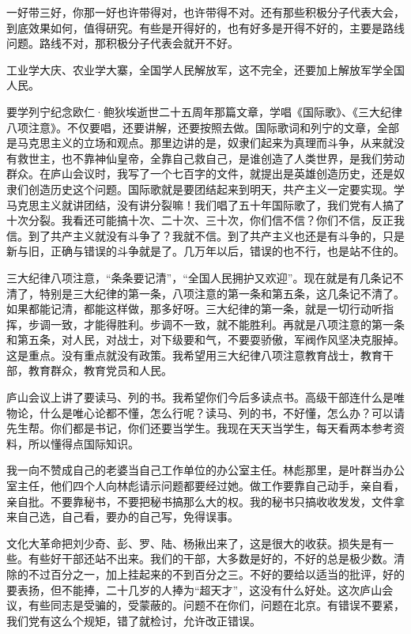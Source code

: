 一好带三好，你那一好也许带得对，也许带得不对。还有那些积极分子代表大会，到底效果如何，值得研究。有些是开得好的，也有好多是开得不好的，主要是路线问题。路线不对，那积极分子代表会就开不好。

工业学大庆、农业学大寨，全国学人民解放军，这不完全，还要加上解放军学全国人民。

要学列宁纪念欧仁·鲍狄埃逝世二十五周年那篇文章，学唱《国际歌》、《三大纪律八项注意》。不仅要唱，还要讲解，还要按照去做。国际歌词和列宁的文章，全部是马克思主义的立场和观点。那里边讲的是，奴隶们起来为真理而斗争，从来就没有救世主，也不靠神仙皇帝，全靠自己救自己，是谁创造了人类世界，是我们劳动群众。在庐山会议时，我写了一个七百字的文件，就提出是英雄创造历史，还是奴隶们创造历史这个问题。国际歌就是要团结起来到明天，共产主义一定要实现。学马克思主义就讲团结，没有讲分裂嘛！我们唱了五十年国际歌了，我们党有人搞了十次分裂。我看还可能搞十次、二十次、三十次，你们信不信？你们不信，反正我信。到了共产主义就没有斗争了？我就不信。到了共产主义也还是有斗争的，只是新与旧，正确与错误的斗争就是了。几万年以后，错误的也不行，也是站不住的。

三大纪律八项注意，“条条要记清”，“全国人民拥护又欢迎”。现在就是有几条记不清了，特别是三大纪律的第一条，八项注意的第一条和第五条，这几条记不清了。如果都能记清，都能这样做，那多好呀。三大纪律的第一条，就是一切行动听指挥，步调一致，才能得胜利。步调不一致，就不能胜利。再就是八项注意的第一条和第五条，对人民，对战士，对下级要和气，不要耍骄傲，军阀作风坚决克服掉。这是重点。没有重点就没有政策。我希望用三大纪律八项注意教育战士，教育干部，教育群众，教育党员和人民。

庐山会议上讲了要读马、列的书。我希望你们今后多读点书。高级干部连什么是唯物论，什么是唯心论都不懂，怎么行呢？读马、列的书，不好懂，怎么办？可以请先生帮。你们都是书记，你们还要当学生。我现在天天当学生，每天看两本参考资料，所以懂得点国际知识。

我一向不赞成自己的老婆当自己工作单位的办公室主任。林彪那里，是叶群当办公室主任，他们四个人向林彪请示问题都要经过她。做工作要靠自己动手，亲自看，亲自批。不要靠秘书，不要把秘书搞那么大的权。我的秘书只搞收收发发，文件拿来自己选，自己看，要办的自己写，免得误事。

文化大革命把刘少奇、彭、罗、陆、杨揪出来了，这是很大的收获。损失是有一些。有些好干部还站不出来。我们的干部，大多数是好的，不好的总是极少数。清除的不过百分之一，加上挂起来的不到百分之三。不好的要给以适当的批评，好的要表扬，但不能捧，二十几岁的人捧为“超天才”，这没有什么好处。这次庐山会议，有些同志是受骗的，受蒙蔽的。问题不在你们，问题在北京。有错误不要紧，我们党有这么个规矩，错了就检讨，允许改正错误。


